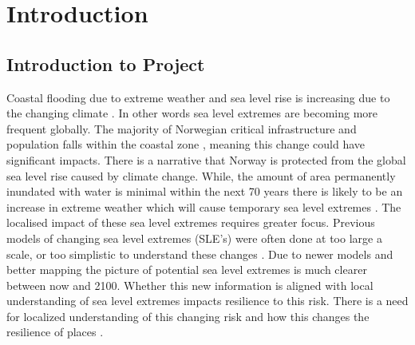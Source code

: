 




\chapter{Introduction}
\section{Introduction to Project}
Coastal flooding due to extreme weather and sea level rise is increasing due to the changing climate \cite{hoffken_effects_2020}.  In other words sea level extremes are becoming more frequent globally. The majority of Norwegian critical infrastructure and population falls within the coastal zone \cite{engebakken_construction_2022}, meaning this change could have significant impacts. There is a narrative that Norway is protected from the global sea level rise caused by climate change. While, the amount of area permanently inundated with water is minimal within the next 70 years there is likely to be an increase in extreme weather which will cause temporary sea level extremes \cite{aunan_strong_2008}. The localised impact of these sea level extremes requires greater focus. Previous models of changing sea level extremes (SLE's) were often done at too large a scale, or too simplistic to understand these changes \cite{hoffken_effects_2020}. Due to newer models and better mapping the picture of potential sea level extremes is much clearer between now and 2100. Whether this new information is aligned with local understanding of sea level extremes impacts resilience to this risk\cite{setten_we_2019}.  There is a need for localized understanding of this changing risk and how this changes the resilience of places \cite{rod_integrated_2012}.
